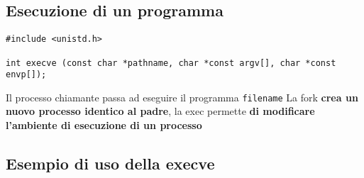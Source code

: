 \documentclass[italian,12pt,a4paper]{article}
\begin{document}
\subsection{Esecuzione di un programma}
\begin{verbatim}
#include <unistd.h>

int execve (const char *pathname, char *const argv[], char *const envp[]);
\end{verbatim}
Il processo chiamante passa ad eseguire il programma \verb|filename|
La fork \textbf{crea un nuovo processo identico al padre}, la exec permette \textbf{di modificare l'ambiente di esecuzione di un processo}
\subsection{Esempio di uso della execve}



\newpage
\listoffigures
\end{document}
